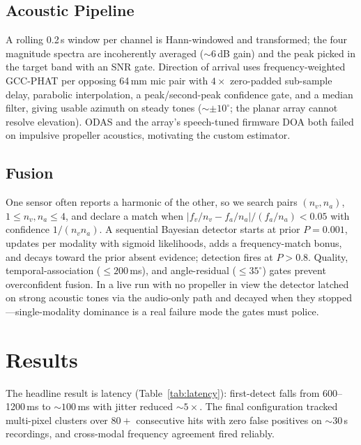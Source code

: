\documentclass[conference]{IEEEtran}
\begin{document}
\subsection{Acoustic Pipeline}
A rolling 0.2\,s window per channel is Hann-windowed and transformed; the
four magnitude spectra are incoherently averaged (${\sim}6$\,dB gain) and
the peak picked in the target band with an SNR gate. Direction of arrival
uses frequency-weighted GCC-PHAT \cite{knapp1976} per opposing 64\,mm mic
pair with $4\times$ zero-padded sub-sample delay, parabolic interpolation,
a peak/second-peak confidence gate, and a median filter, giving usable
azimuth on steady tones (${\sim}\pm 10^{\circ}$; the planar array cannot
resolve elevation). ODAS \cite{grondin2019} and the array's speech-tuned
firmware DOA both failed on impulsive propeller acoustics, motivating the
custom estimator.

\subsection{Fusion}
\label{sec:fusion}
One sensor often reports a harmonic of the other, so we search pairs
$(n_v,n_a)$, $1\le n_v,n_a\le 4$, and declare a match when
$|f_v/n_v - f_a/n_a|/(f_a/n_a) < 0.05$ with confidence $1/(n_v n_a)$. A
sequential Bayesian detector starts at prior $P=0.001$, updates per
modality with sigmoid likelihoods, adds a frequency-match bonus, and decays
toward the prior absent evidence; detection fires at $P>0.8$. Quality,
temporal-association ($\le 200$\,ms), and angle-residual ($\le 35^{\circ}$)
gates prevent overconfident fusion. In a live run with no propeller in view
the detector latched on strong acoustic tones via the audio-only path and
decayed when they stopped---single-modality dominance is a real failure
mode the gates must police.

\section{Results}
The headline result is latency (Table~\ref{tab:latency}): first-detect
falls from 600--1200\,ms to ${\sim}100$\,ms with jitter reduced
${\sim}5\times$. The final configuration tracked multi-pixel clusters over
$80{+}$ consecutive hits with zero false positives on ${\sim}30$\,s
recordings, and cross-modal frequency agreement fired reliably.
\end{document}
